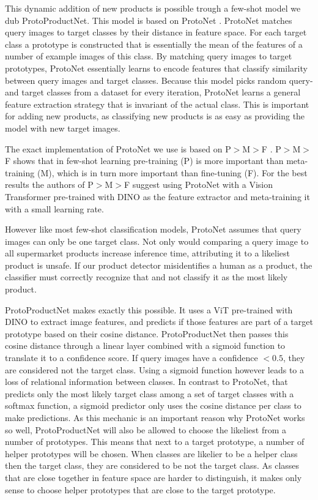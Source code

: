 This dynamic addition of new products is possible trough a
few-shot model we dub ProtoProductNet. This model is based
on ProtoNet \cite{protonet_2017}. ProtoNet matches query
images to target classes by their distance in feature space.
For each target class a prototype is constructed that is
essentially the mean of the features of a number of example
images of this class. By matching query images to target
prototypes, ProtoNet essentially learns to encode features
that classify similarity between query images and target
classes. Because this model picks random query- and target
classes from a dataset for every iteration, ProtoNet learns
a general feature extraction strategy that is invariant of the
actual class. This is important for adding new
products, as classifying new products is as easy as
providing the model with new target images.

The exact implementation of ProtoNet we use is based on P$>$M$>$F \cite{pmf_2022}. P$>$M$>$F shows that in few-shot learning pre-training (P) is more important than meta-training (M), which is in turn more important than fine-tuning (F). For the best results the authors of P$>$M$>$F suggest using ProtoNet with a Vision Transformer pre-trained with DINO \cite{dino_2021} as the feature extractor and meta-training it with a small learning rate.

However like most few-shot classification models, ProtoNet assumes that query images can only be one  target class. Not only would comparing a query image to all supermarket products increase inference time, attributing it to a likeliest product is unsafe. If our product detector misidentifies a human as a product, the classifier must correctly recognize that and not classify it as the most likely product.

ProtoProductNet makes exactly this possible. It uses a ViT pre-trained with DINO to extract image features, and predicts if those features are part of a target prototype based on their cosine distance. ProtoProductNet then passes this cosine distance through a linear layer combined with a sigmoid function to translate it to a confidence score. If query images have a confidence $<0.5$, they are considered not the target class. Using a sigmoid function however leads to a loss of relational information between classes. In contrast to ProtoNet, that predicts only the most likely target class among a set of target classes with a softmax function, a sigmoid predictor only uses the cosine distance per class to make predictions. As this mechanic is an important reason why ProtoNet works so well, ProtoProductNet will also be allowed to choose the likeliest from a number of prototypes. This means that next to a target prototype, a number of helper prototypes will be chosen. When classes are likelier to be a helper class then the target class, they are considered to be not the target class. As classes that are close together in feature space are harder to distinguish, it makes only sense to choose helper prototypes that are close to the target prototype.

